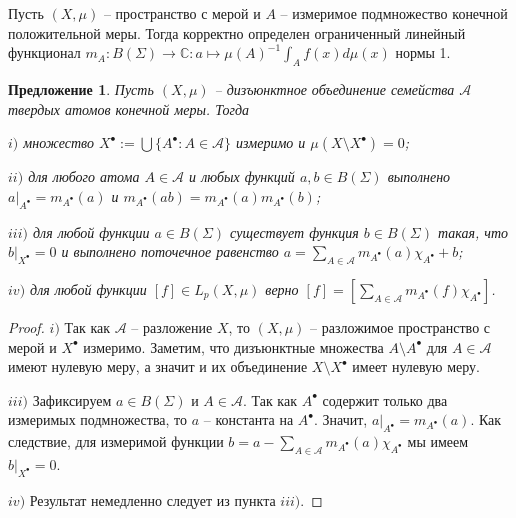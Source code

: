\documentclass[12pt]{article}
\newtheorem{proposition}[theorem]{Предложение}
\begin{document}
Пусть $(X,\mu)$ -- пространство с мерой и $A$ -- измеримое подмножество конечной положительной меры. Тогда корректно определен ограниченный линейный функционал $m_A:B(\Sigma)\to\mathbb{C}:a\mapsto \mu(A)^{-1}\int_A f(x)d\mu(x)$ нормы 1.

\begin{proposition}\label{HardAtomicMeasProp} Пусть $(X,\mu)$ -- дизъюнктное объединение семейства $\mathcal{A}$ твердых атомов конечной меры. Тогда

    $i)$ множество $X^\bullet:=\bigcup \{A^\bullet:A\in\mathcal{A}\}$ измеримо и $\mu(X\setminus X^\bullet)=0$;

    $ii)$ для любого атома $A\in\mathcal{A}$ и любых функций $a,b\in B(\Sigma)$ выполнено $a|_{A^\bullet}=m_{A^\bullet}(a)$ и $m_{A^\bullet}(ab)=m_{A^\bullet}(a)m_{A^\bullet}(b)$;

    $iii)$ для любой функции $a\in B(\Sigma)$ существует функция $b\in B(\Sigma)$ такая, что $b|_{X^\bullet}=0$ и выполнено поточечное равенство $a=\sum_{A\in\mathcal{A}} m_{A^\bullet}(a)\chi_{A^\bullet} + b$;

    $iv)$ для любой функции $[f]\in L_p(X,\mu)$ верно $[f]=[\sum_{A\in\mathcal{A}} m_{A^\bullet}(f)\chi_{A^\bullet}]$.
\end{proposition}
\begin{proof} $i)$ Так как $\mathcal{A}$ -- разложение $X$, то $(X,\mu)$ -- разложимое пространство с мерой и $X^\bullet$ измеримо. Заметим, что дизъюнктные множества $A\setminus A^\bullet$ для $A\in\mathcal{A}$ имеют нулевую меру, а значит и их объединение $X\setminus X^\bullet$ имеет нулевую меру.

    $iii)$ Зафиксируем $a\in B(\Sigma)$ и $A\in \mathcal{A}$. Так как $A^\bullet$ содержит только два измеримых подмножества, то $a$ -- константа на $A^\bullet$. Значит, $a|_{A^\bullet}=m_{A^\bullet}(a)$. Как следствие, для измеримой функции $b=a-\sum_{A\in\mathcal{A}}m_{A^\bullet}(a)\chi_{A^\bullet}$ мы имеем $b|_{X^\bullet}=0$.

    $iv)$ Результат немедленно следует из пункта $iii)$.
\end{proof}
\end{document}
